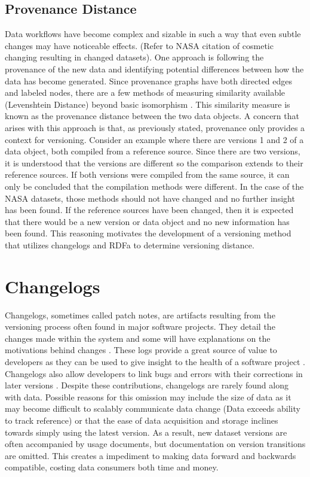 \subsection{Provenance Distance}

Data workflows have become complex and sizable in such a way that even subtle changes may have noticeable effects.
(Refer to NASA citation of cosmetic changing resulting in changed datasets).
One approach is following the provenance of the new data and identifying potential differences between how the data has become generated.
Since provenance graphs have both directed edges and labeled nodes, there are a few methods of measuring similarity available (Levenshtein Distance) beyond basic isomorphism \cite{Cao2013} \cite{Gao2010} \cite{Goddard:1996:DGU:246962.246972} .
This similarity measure is known as the provenance distance between the two data objects.
A concern that arises with this approach is that, as previously stated, provenance only provides a context for versioning.
Consider an example where there are versions 1 and 2 of a data object, both compiled from a reference source.
Since there are two versions, it is understood that the versions are different so the comparison extends to their reference sources.
If both versions were compiled from the same source, it can only be concluded that the compilation methods were different.
In the case of the NASA datasets, those methods should not have changed and no further insight has been found.
If the reference sources have been changed, then it is expected that there would be a new version or data object and no new information has been found.
This reasoning motivates the development of a versioning method that utilizes changelogs and RDFa to determine versioning distance.

\section{Changelogs}

Changelogs, sometimes called patch notes, are artifacts resulting from the versioning process often found in major software projects.
They detail the changes made within the system and some will have explanations on the motivations behind changes \cite{uel1037}.
These logs provide a great source of value to developers as they can be used to give insight to the health of a software project \cite{German03automatingthe} \cite{6132954}.
Changelogs also allow developers to link bugs and errors with their corrections in later versions \cite{Chen:2004:OCL:990374.990391}.
Despite these contributions, changelogs are rarely found along with data.
Possible reasons for this omission may include the size of data  as it may become difficult to scalably communicate data change (Data exceeds ability to track reference) or that the ease of data acquisition and storage inclines towards simply using the latest version.
As a result, new dataset versions are often accompanied by usage documents, but documentation on version transitions are omitted.
This creates a impediment to making data forward and backwards compatible, costing data consumers both time and money.

